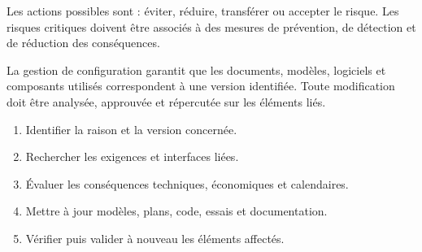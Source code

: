Les actions possibles sont : éviter, réduire, transférer ou accepter le risque. Les risques critiques doivent être associés à des mesures de prévention, de détection et de réduction des conséquences.

La gestion de configuration garantit que les documents, modèles, logiciels et composants utilisés correspondent à une version identifiée. Toute modification doit être analysée, approuvée et répercutée sur les éléments liés.

\begin{ISmethode}[title={Analyser une modification}]
\begin{enumerate}
  \item Identifier la raison et la version concernée.
  \item Rechercher les exigences et interfaces liées.
  \item Évaluer les conséquences techniques, économiques et calendaires.
  \item Mettre à jour modèles, plans, code, essais et documentation.
  \item Vérifier puis valider à nouveau les éléments affectés.
\end{enumerate}
\end{ISmethode}
